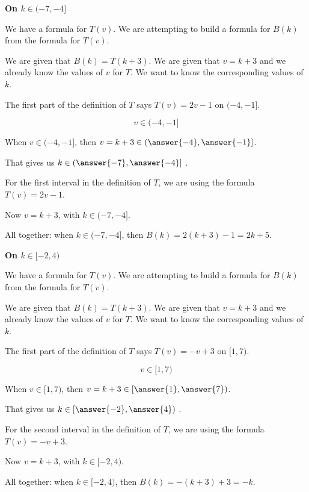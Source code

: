 \documentclass{ximera}
\begin{document}
\begin{explanation} \textbf{\textcolor{red!75!green}{On $k \in (-7,-4]$}}


We have a formula for $T(v)$.  We are attempting to build a formula for $B(k)$ from the formula for $T(v)$.

We are given that $B(k) = T(k+3)$.  We are given that $v = k+3$ and we already know the values of $v$ for $T$.  We want to know the corresponding values of $k$.

The first part of the definition of $T$ says $T(v) = 2v - 1$ on $(-4,-1]$.

\[
v \in (-4,-1]
\]

When $v \in (-4,-1]$, then $v = k+3 \in \left(\answer{-4},\answer{-1}\right]$.  

That gives us $k \in \left(\answer{-7},\answer{-4}\right]$ .


For the first interval in the definition of $T$, we are using the formula $T(v) = 2v - 1$. 

Now $v = k + 3$, with $k \in (-7,-4]$.

All together: when $k \in (-7,-4]$, then $B(k) = 2(k+3)-1 = 2k+5$. 

\end{explanation}







\begin{explanation} \textbf{\textcolor{red!75!green}{On $k \in [-2,4)$}} 


We have a formula for $T(v)$.  We are attempting to build a formula for $B(k)$ from the formula for $T(v)$.

We are given that $B(k) = T(k+3)$.  We are given that $v = k+3$ and we already know the values of $v$ for $T$.  We want to know the corresponding values of $k$.

The first part of the definition of $T$ says $T(v) = -v + 3$ on $[1,7)$.

\[
v \in [1,7)
\]

When $v \in [1,7)$, then $v = k+3 \in \left[\answer{1},\answer{7}\right)$.  

That gives us $k \in \left[\answer{-2},\answer{4}\right)$ .


For the second interval in the definition of $T$, we are using the formula $T(v) = -v + 3$. 

Now $v = k + 3$, with $k \in [-2, 4)$.

All together: when $k \in [-2, 4)$, then $B(k) = -(k+3)+3 = -k$. 

\end{explanation}
\end{document}

